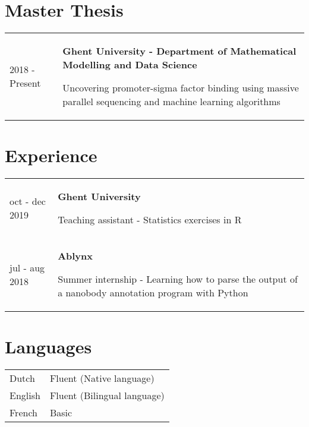 \documentclass{article}
\begin{document}
\section{Master Thesis}
\begin{tabular}{ p{2.3cm} p{12cm}}
    2018 - Present & \textbf{Ghent University - Department of Mathematical Modelling and Data Science}

    Uncovering promoter-sigma factor binding using massive parallel sequencing and machine learning algorithms \\
\end{tabular}

\section{Experience}
\begin{tabular}{ p{2.3cm} p{12cm} }
    oct - dec 2019 & \textbf{Ghent University}

    Teaching assistant - Statistics exercises in R \\

    jul - aug 2018 & \textbf{Ablynx}
    
    Summer internship - Learning how to parse the output of a nanobody annotation program with Python\\
\end{tabular}

\section{Languages}
\begin{tabular}{ p{2.3cm} p{12cm} }
    Dutch & Fluent (Native language) \\
    English & Fluent (Bilingual language) \\
    French & Basic\\
\end{tabular}
\end{document}
